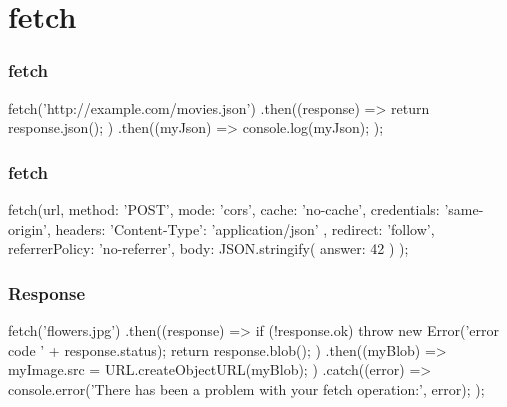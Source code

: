 \section{fetch}
\begin{frame}[fragile]
\frametitle{fetch}
\begin{CodeBox}{}
fetch('http://example.com/movies.json')
  .then((response) => {
    return response.json();
  })
  .then((myJson) => {
    console.log(myJson);
  });
\end{CodeBox}
\end{frame}

\begin{frame}[fragile]
\frametitle{fetch}
\begin{CodeBox}{}
fetch(url, {
  method: 'POST',
  mode: 'cors',
  cache: 'no-cache',
  credentials: 'same-origin',
  headers: {
    'Content-Type': 'application/json'
  },
  redirect: 'follow',
  referrerPolicy: 'no-referrer',
  body: JSON.stringify( { answer: 42 } )
});
\end{CodeBox}
\end{frame}

\begin{frame}[fragile]
\frametitle{Response}
\begin{CodeBox}{}
fetch('flowers.jpg')
  .then((response) => {
    if (!response.ok) {
      throw new Error('error code ' + response.status);
    }
    return response.blob();
  })
  .then((myBlob) => {
    myImage.src = URL.createObjectURL(myBlob);
  })
  .catch((error) => {
    console.error('There has been a problem with your fetch operation:', error);
  });
  \end{CodeBox}
\end{frame}
